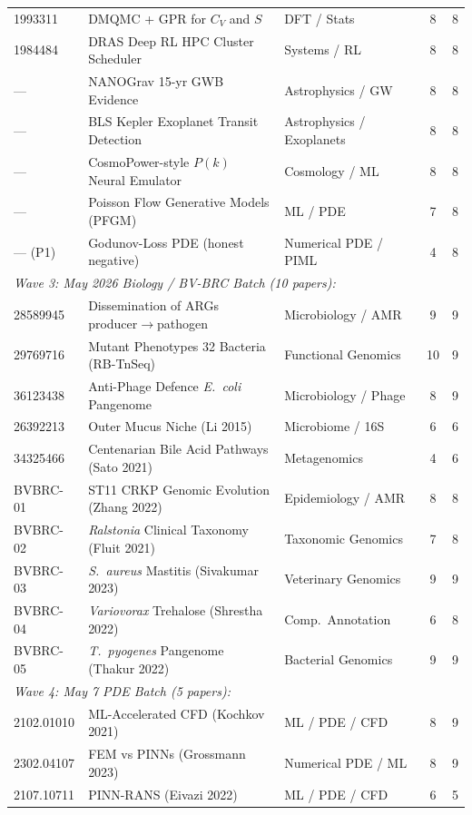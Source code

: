 \begin{longtable}{lllcc}
1993311 & DMQMC + GPR for $C_V$ and $S$ & DFT / Stats & 8 & 8 \\
1984484 & DRAS Deep RL HPC Cluster Scheduler & Systems / RL & 8 & 8 \\
— & NANOGrav 15-yr GWB Evidence & Astrophysics / GW & 8 & 8 \\
— & BLS Kepler Exoplanet Transit Detection & Astrophysics / Exoplanets & 8 & 8 \\
— & CosmoPower-style $P(k)$ Neural Emulator & Cosmology / ML & 8 & 8 \\
— & Poisson Flow Generative Models (PFGM) & ML / PDE & 7 & 8 \\
— (P1) & Godunov-Loss PDE (honest negative) & Numerical PDE / PIML & 4 & 8 \\
\midrule
\multicolumn{3}{l}{\textit{Wave 3: May 2026 Biology / BV-BRC Batch (10 papers):}} & & \\
28589945 & Dissemination of ARGs producer$\to$pathogen & Microbiology / AMR & 9 & 9 \\
29769716 & Mutant Phenotypes 32 Bacteria (RB-TnSeq) & Functional Genomics & 10 & 9 \\
36123438 & Anti-Phage Defence \textit{E.\ coli} Pangenome & Microbiology / Phage & 8 & 9 \\
26392213 & Outer Mucus Niche (Li 2015) & Microbiome / 16S & 6 & 6 \\
34325466 & Centenarian Bile Acid Pathways (Sato 2021) & Metagenomics & 4 & 6 \\
BVBRC-01 & ST11 CRKP Genomic Evolution (Zhang 2022) & Epidemiology / AMR & 8 & 8 \\
BVBRC-02 & \textit{Ralstonia} Clinical Taxonomy (Fluit 2021) & Taxonomic Genomics & 7 & 8 \\
BVBRC-03 & \textit{S.\ aureus} Mastitis (Sivakumar 2023) & Veterinary Genomics & 9 & 9 \\
BVBRC-04 & \textit{Variovorax} Trehalose (Shrestha 2022) & Comp.\ Annotation & 6 & 8 \\
BVBRC-05 & \textit{T.\ pyogenes} Pangenome (Thakur 2022) & Bacterial Genomics & 9 & 9 \\
\midrule
\multicolumn{3}{l}{\textit{Wave 4: May 7 PDE Batch (5 papers):}} & & \\
2102.01010 & ML-Accelerated CFD (Kochkov 2021) & ML / PDE / CFD & 8 & 9 \\
2302.04107 & FEM vs PINNs (Grossmann 2023) & Numerical PDE / ML & 8 & 9 \\
2107.10711 & PINN-RANS (Eivazi 2022) & ML / PDE / CFD & 6 & 5 \\

\end{longtable}

